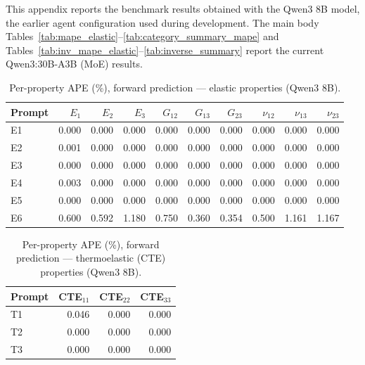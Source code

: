 \documentclass[preprint,review,10pt,number]{elsarticle}
\begin{document}
This appendix reports the benchmark results obtained with the Qwen3 8B model, the earlier agent configuration used during development. The main body Tables~\ref{tab:mape_elastic}--\ref{tab:category_summary_mape} and Tables~\ref{tab:inv_mape_elastic}--\ref{tab:inverse_summary} report the current Qwen3:30B-A3B (MoE) results.

\begin{table}[htbp]
\centering
\caption{Per-property APE (\%), forward prediction --- elastic properties (Qwen3 8B).}
\label{tab:mape_elastic_8b}
\begin{tabular}{lrrrrrrrrr}
\toprule
\textbf{Prompt} & $E_1$ & $E_2$ & $E_3$ & $G_{12}$ & $G_{13}$ & $G_{23}$ & $\nu_{12}$ & $\nu_{13}$ & $\nu_{23}$ \\
\midrule
E1 & 0.000 & 0.000 & 0.000 & 0.000 & 0.000 & 0.000 & 0.000 & 0.000 & 0.000 \\
E2 & 0.001 & 0.000 & 0.000 & 0.000 & 0.000 & 0.000 & 0.000 & 0.000 & 0.000 \\
E3 & 0.000 & 0.000 & 0.000 & 0.000 & 0.000 & 0.000 & 0.000 & 0.000 & 0.000 \\
E4 & 0.003 & 0.000 & 0.000 & 0.000 & 0.000 & 0.000 & 0.000 & 0.000 & 0.000 \\
E5 & 0.000 & 0.000 & 0.000 & 0.000 & 0.000 & 0.000 & 0.000 & 0.000 & 0.000 \\
E6 & 0.600 & 0.592 & 1.180 & 0.750 & 0.360 & 0.354 & 0.500 & 1.161 & 1.167 \\
\bottomrule
\end{tabular}
\end{table}

\begin{table}[htbp]
\centering
\caption{Per-property APE (\%), forward prediction --- thermoelastic (CTE) properties (Qwen3 8B).}
\label{tab:mape_thermoelastic_8b}
\begin{tabular}{lrrr}
\toprule
\textbf{Prompt} & CTE$_{11}$ & CTE$_{22}$ & CTE$_{33}$ \\
\midrule
T1 & 0.046 & 0.000 & 0.000 \\
T2 & 0.000 & 0.000 & 0.000 \\
T3 & 0.000 & 0.000 & 0.000 \\
\bottomrule
\end{tabular}
\end{table}
\end{document}
